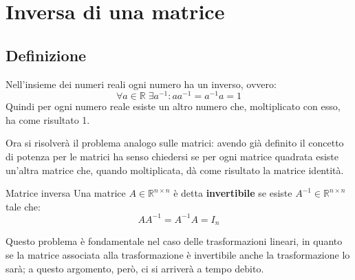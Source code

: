 \chapter{Inversa di una matrice}
\section{Definizione}
Nell'insieme dei numeri reali ogni numero ha un inverso, ovvero:
\[
    \forall a \in \mathbb{R} \; \exists a^{-1} : aa^{-1} = a^{-1}a = 1
\]
Quindi per ogni numero reale esiste un altro numero che, moltiplicato con esso, ha come risultato 1.

Ora si risolverà il problema analogo sulle matrici: avendo già definito il concetto di potenza per le matrici ha senso chiedersi se per ogni matrice quadrata esiste un'altra matrice che, quando moltiplicata, dà come risultato la matrice identità.

\begin{newdef}{Matrice inversa}
    Una matrice $A \in \mathbb{R}^{n \times n}$ è detta \textbf{invertibile} se esiste $A^{-1} \in \mathbb{R}^{n \times n}$ tale che:
    \[
        AA^{-1} = A^{-1}A = I_n
    \]
\end{newdef}

Questo problema è fondamentale nel caso delle trasformazioni lineari, in quanto se la matrice associata alla trasformazione è invertibile anche la trasformazione lo sarà; a questo argomento, però, ci si arriverà a tempo debito.


